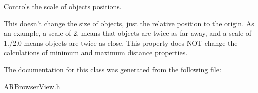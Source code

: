 \-Controls the scale of objects positions. 

\-This doesn't change the size of objects, just the relative position to the origin. \-As an example, a scale of 2. means that objects are twice as far away, and a scale of 1./2.0 means objects are twice as close. \-This property does \-N\-O\-T change the calculations of minimum and maximum distance properties. 

\-The documentation for this class was generated from the following file\-:\begin{DoxyCompactItemize}
\item 
\-A\-R\-Browser\-View.\-h\end{DoxyCompactItemize}

